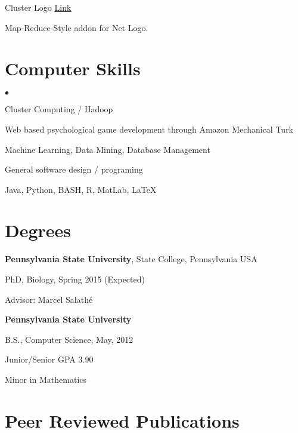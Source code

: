 \documentclass[margin,line]{res}
\newcommand{\linkToUrl}[1]{{\color{blue}\underline{\href{#1}{Link}}}}
\newenvironment{list1}{
  \begin{list}{\ding{113}}{%
      \setlength{\itemsep}{0in}
      \setlength{\parsep}{0in} \setlength{\parskip}{0in}
      \setlength{\topsep}{0in} \setlength{\partopsep}{0in} 
      \setlength{\leftmargin}{0.17in}}}{\end{list}}
\newenvironment{list2}{
  \begin{list}{$\bullet$}{%
      \setlength{\itemsep}{0in}
      \setlength{\parsep}{0in} \setlength{\parskip}{0in}
      \setlength{\topsep}{0in} \setlength{\partopsep}{0in} 
      \setlength{\leftmargin}{10pt}}}{\end{list}}
\begin{document}
\begin{resume}
Cluster Logo \linkToUrl{http://bit.ly/12UQ4cq}
\begin{list1}
\item[] Map-Reduce-Style addon for Net Logo.
\end{list1}

\section{\sc Computer Skills} 
\begin{list2}
\item Cluster Computing / Hadoop 
\item Web based psychological game development through Amazon Mechanical Turk
\item Machine Learning, Data Mining, Database Management
\item General software design / programing
\item Java, Python, BASH, R, MatLab, \LaTeX
\end{list2}

\newpage

\section{\sc Degrees}
{\bf Pennsylvania State University}, State College, Pennsylvania USA\\
\vspace*{-.1in}
\begin{list1}
\item[] PhD, Biology, Spring 2015 (Expected)
\item[] Advisor: Marcel Salath\'e
\end{list1}



{\bf Pennsylvania State University} \\
\vspace*{-.1in}
\begin{list1}
\item[] B.S., Computer Science,  May, 2012 
\item[] Junior/Senior GPA 3.90
\item[] Minor in Mathematics
\end{list1}

\section{\sc Peer Reviewed Publications}

\begin{etaremune}[start=5,leftmargin=13pt]


\end{etaremune}
\end{resume}
\end{document}
